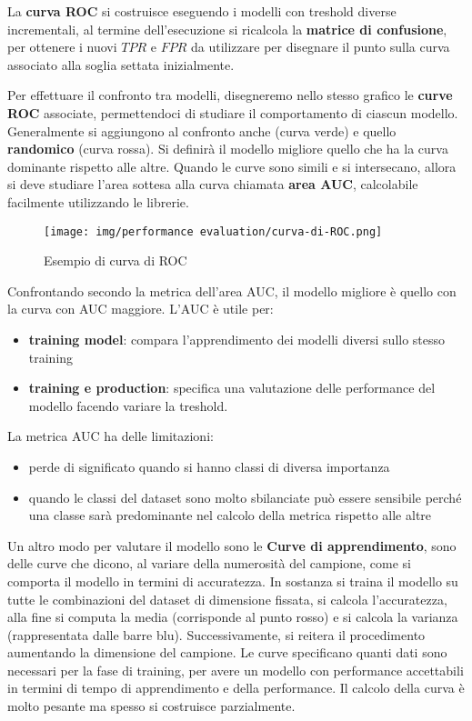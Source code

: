La \textbf{curva ROC} si costruisce eseguendo i modelli con treshold diverse incrementali,
al termine dell'esecuzione si ricalcola la \textbf{matrice di confusione}, per
ottenere i nuovi $TPR$ e $FPR$ da utilizzare per disegnare il punto sulla curva 
associato alla soglia settata inizialmente.

Per effettuare il confronto tra modelli, disegneremo nello stesso grafico le 
\textbf{curve ROC} associate, permettendoci di studiare il comportamento di ciascun
modello. Generalmente si aggiungono al confronto anche  (curva verde) 
e quello \textbf{randomico} (curva rossa). Si definirà il modello migliore quello che ha la curva
dominante rispetto alle altre. Quando le curve sono simili e si intersecano, allora 
si deve studiare l'area sottesa alla curva chiamata \textbf{area AUC}, calcolabile 
facilmente utilizzando le librerie. 

\begin{figure}[!ht]
    \centering
    \texttt{[image: img/performance evaluation/curva-di-ROC.png]}
    \caption{Esempio di curva di ROC}
    \label{fig:curva-di-ROC}
\end{figure}

Confrontando secondo la metrica dell'area AUC, il modello 
migliore è quello con la curva con AUC maggiore. L'AUC è utile per:
\begin{itemize}
    \item \textbf{training model}: compara l'apprendimento dei modelli diversi
    sullo stesso training
    \item \textbf{training e production}: specifica una valutazione delle performance 
    del modello facendo variare la treshold.
\end{itemize}
La metrica AUC ha delle limitazioni:
\begin{itemize}
    \item perde di significato quando si hanno classi di diversa importanza
    \item quando le classi del dataset sono molto sbilanciate può essere sensibile
    perché una classe sarà predominante nel calcolo della metrica rispetto alle 
    altre
\end{itemize}


Un altro modo per valutare il modello sono le \textbf{Curve di apprendimento},
sono delle curve che dicono, al variare della numerosità del campione, come si 
comporta il modello in termini di accuratezza. In sostanza si traina il modello
su tutte le combinazioni del dataset di dimensione fissata, si calcola l'accuratezza,
alla fine si computa la media (corrisponde al punto rosso) e si calcola la varianza
(rappresentata dalle barre blu). Successivamente, si reitera il procedimento aumentando
la dimensione del campione. Le curve specificano quanti dati sono necessari per 
la fase di training, per avere un modello con performance accettabili in termini
di tempo di apprendimento e della performance. Il calcolo della curva è molto 
pesante ma spesso si costruisce parzialmente.

